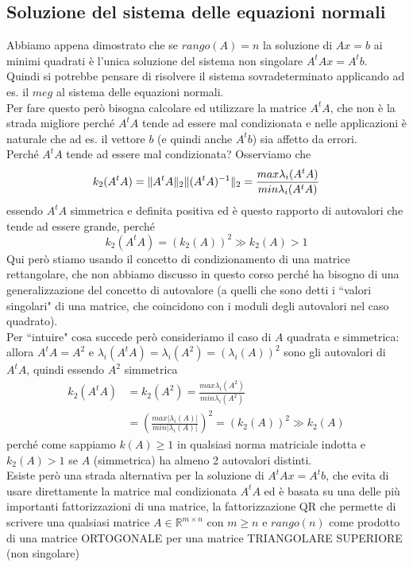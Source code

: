 \documentclass[12pt,a4paper]{article}
\DeclarePairedDelimiter{\norma}{\lVert}{\rVert}
\begin{document}
\subsection{Soluzione del sistema delle equazioni normali}
Abbiamo appena dimostrato che se $rango(A)=n$ la soluzione di $Ax=b$ ai minimi quadrati è l'unica soluzione del sistema non singolare $A^tAx=A^tb$. \\
Quindi si potrebbe pensare di risolvere il sistema sovradeterminato applicando ad es. il $meg$ al sistema delle equazioni normali. \\
Per fare questo però bisogna calcolare ed utilizzare la matrice $A^tA$, che non è la strada migliore perché $A^tA$ tende ad essere mal condizionata e nelle applicazioni è naturale che ad es. il vettore $b$ (e quindi anche $A^tb$) sia affetto da errori. \\
Perché $A^tA$ tende ad essere mal condizionata? Osserviamo che 
\begin{equation*}
    k_2(A^tA)=\norma{A^tA}_2\norma{(A^tA)^{-1}}_2 = \frac{max\lambda_i(A^tA)}{min \lambda_i(A^tA)}
\end{equation*}
essendo $A^tA$ simmetrica e definita positiva ed è questo rapporto di autovalori che tende ad essere grande, perché
\begin{equation*}
    k_2(A^tA)=(k_2(A))^2 \gg k_2(A) > 1
\end{equation*}
Qui però stiamo usando il concetto di condizionamento di una matrice rettangolare, che non abbiamo discusso in questo corso perché ha bisogno di una generalizzazione del concetto di autovalore (a quelli che sono detti i ``valori singolari" di una matrice, che coincidono con i moduli degli autovalori nel caso quadrato). \\
Per ``intuire" cosa succede però consideriamo il caso di $A$ quadrata e simmetrica: allora $A^tA=A^2$ e $\lambda_i(A^tA)=\lambda_i(A^2)=(\lambda_i(A))^2$ sono gli autovalori di $A^tA$, quindi essendo $A^2$ simmetrica
\begin{equation*}
    \begin{split}
         k_2(A^tA) & = k_2(A^2)=\frac{max \lambda_i(A^2)}{min \lambda_i(A^2)} \\
         & = \left(\frac{max |\lambda_i(A)|}{min |\lambda_i(A)|} \right)^2 = (k_2(A))^2 \gg k_2(A)
    \end{split}
\end{equation*}
perché come sappiamo $k(A) \geq 1$ in qualsiasi norma matriciale indotta e $k_2(A) > 1$ se $A$ (simmetrica) ha almeno 2 autovalori distinti. \\
Esiste però una strada alternativa per la soluzione di $A^tAx=A^tb$, che evita di usare direttamente la matrice mal condizionata $A^tA$ ed è basata su una delle più importanti fattorizzazioni di una matrice, la fattorizzazione QR che permette di scrivere una qualsiasi matrice $A\in \mathbb{R}^{m \times n}$ con $m\geq n$ e $rango(n)$ come prodotto di una matrice ORTOGONALE per una matrice TRIANGOLARE SUPERIORE (non singolare)
\end{document}
